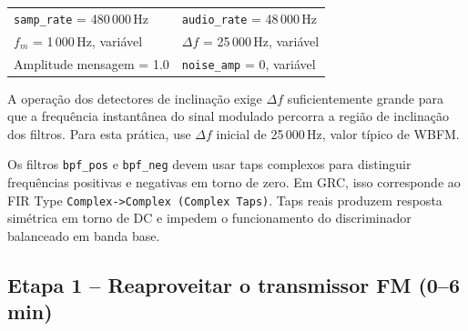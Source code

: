 \documentclass[11pt,a4paper]{article}
\begin{document}
\begin{center}
\begin{tabular}{l l}
  \texttt{samp\_rate} = 480\,000\,Hz & \texttt{audio\_rate} = 48\,000\,Hz \\
  $f_m$ = 1\,000\,Hz, variável        & $\Delta f$ = 25\,000\,Hz, variável \\
  Amplitude mensagem = 1.0 & \texttt{noise\_amp} = 0, variável \\
\end{tabular}
\end{center}

\begin{atencao}
A operação dos detectores de inclinação exige $\Delta f$ suficientemente
grande para que a frequência instantânea do sinal modulado percorra a
região de inclinação dos filtros. Para esta prática, use $\Delta f$
inicial de 25\,000\,Hz, valor típico de WBFM.
\end{atencao}

\begin{atencao}
Os filtros \texttt{bpf\_pos} e \texttt{bpf\_neg} devem usar taps complexos
para distinguir frequências positivas e negativas em torno de zero. Em GRC,
isso corresponde ao FIR Type \texttt{Complex->Complex (Complex Taps)}.
Taps reais produzem resposta simétrica em torno de DC e impedem o
funcionamento do discriminador balanceado em banda base.
\end{atencao}

\subsection*{Etapa 1 -- Reaproveitar o transmissor FM (0--6 min)}
\end{document}
